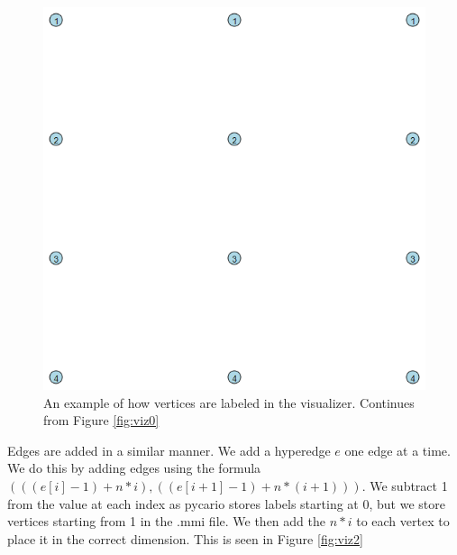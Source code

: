 \begin{figure}[t!]
    \centering
    \begin{minipage}{0.45\textwidth}
        \centering
        \includegraphics[width=\textwidth]{images/viz1.png}
        \caption{An example of how vertices are labeled in the visualizer. Continues from Figure \ref{fig:viz0}}
        \label{fig:viz1}
    \end{minipage}
    \hfill
\end{figure}

Edges are added in a similar manner. We add a hyperedge $e$ one edge at a time. We do this by 
adding edges using the formula $(((e[i] - 1) + n * i), ((e[i+1] - 1) + n * (i + 1)))$. We 
subtract 1 from the value at each index as pycario stores labels starting at 0, but we store
vertices starting from 1 in the .mmi file. We then add the $n * i$ to each vertex to 
place it in the correct dimension. This is seen in Figure \ref{fig:viz2}

